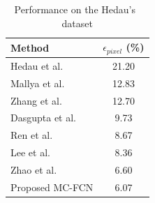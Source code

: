 \begin{table}
	\centering 
	\begin{tabular}{lc}
		\toprule
		Method & $\epsilon_{pixel}$ (\%) \\
		\midrule
		Hedau et al.~\cite{hedau2009recovering} & 21.20 \\
		Mallya et al.~\cite{mallya2015learning} & 12.83 \\
		Zhang et al.~\cite{zhang2017learning} & 12.70 \\
		Dasgupta et al.~\cite{dasgupta2016delay} & 9.73 \\
		Ren et al.~\cite{ren2016coarse} & 8.67 \\
		Lee et al.~\cite{LeeRoomNet17} & 8.36 \\
		Zhao et al.~\cite{zhao2017physics} & 6.60 \\
		\midrule
		Proposed MC-FCN & 6.07 \\
		\bottomrule
	\end{tabular}
	\caption{Performance on the Hedau's~\cite{hedau2009recovering} dataset }
	\label{table:comparison-hedau}
\end{table}




